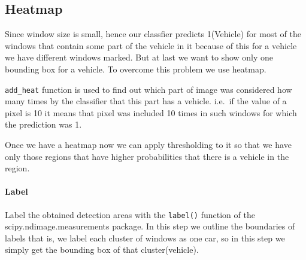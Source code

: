 \documentclass[11pt]{article}
\begin{document}
    \hypertarget{heatmap}{%
\subsection{Heatmap}\label{heatmap}}

Since window size is small, hence our classfier predicts 1(Vehicle) for
most of the windows that contain some part of the vehicle in it because
of this for a vehicle we have different windows marked. But at last we
want to show only one bounding box for a vehicle. To overcome this
problem we use heatmap.

\texttt{add\_heat} function is used to find out which part of image was
considered how many times by the classifier that this part has a
vehicle. i.e.~if the value of a pixel is 10 it means that pixel was
included 10 times in such windows for which the prediction was 1.

Once we have a heatmap now we can apply thresholding to it so that we
have only those regions that have higher probabilities that there is a
vehicle in the region.

\hypertarget{label}{%
\paragraph{Label}\label{label}}

Label the obtained detection areas with the \texttt{label()} function of
the scipy.ndimage.measurements package. In this step we outline the
boundaries of labels that is, we label each cluster of windows as one
car, so in this step we simply get the bounding box of that
cluster(vehicle).
\end{document}
